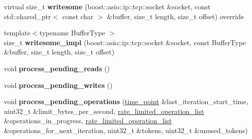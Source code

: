 \begin{DoxyCompactItemize}
virtual size\+\_\+t {\bfseries writesome} (boost\+::asio\+::ip\+::tcp\+::socket \&socket, const std\+::shared\+\_\+ptr$<$ const char $>$ \&buffer, size\+\_\+t length, size\+\_\+t offset) override
\item 
\mbox{\label{classfc_1_1detail_1_1rate__limiting__group__impl_aee2678c053a998c49ad7c671c77fe4dd}} 
{\footnotesize template$<$typename Buffer\+Type $>$ }\\size\+\_\+t {\bfseries writesome\+\_\+impl} (boost\+::asio\+::ip\+::tcp\+::socket \&socket, const Buffer\+Type \&buffer, size\+\_\+t length, size\+\_\+t offset)
\item 
\mbox{\label{classfc_1_1detail_1_1rate__limiting__group__impl_a30e2a1f703fcd1983c5e2afb2dcd1ef7}} 
void {\bfseries process\+\_\+pending\+\_\+reads} ()
\item 
\mbox{\label{classfc_1_1detail_1_1rate__limiting__group__impl_acea1501bba905857cdda6347631eb05b}} 
void {\bfseries process\+\_\+pending\+\_\+writes} ()
\item 
\mbox{\label{classfc_1_1detail_1_1rate__limiting__group__impl_ab87ad5f4ec8adcf3702745b30cd822ad}} 
void {\bfseries process\+\_\+pending\+\_\+operations} (\mbox{\hyperlink{classfc_1_1time__point}{time\+\_\+point}} \&last\+\_\+iteration\+\_\+start\+\_\+time, uint32\+\_\+t \&limit\+\_\+bytes\+\_\+per\+\_\+second, \mbox{\hyperlink{classstd_1_1list}{rate\+\_\+limited\+\_\+operation\+\_\+list}} \&operations\+\_\+in\+\_\+progress, \mbox{\hyperlink{classstd_1_1list}{rate\+\_\+limited\+\_\+operation\+\_\+list}} \&operations\+\_\+for\+\_\+next\+\_\+iteration, uint32\+\_\+t \&tokens, uint32\+\_\+t \&unused\+\_\+tokens)
\end{DoxyCompactItemize}
